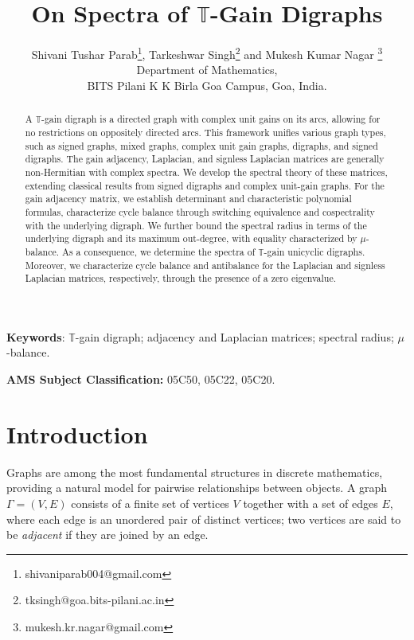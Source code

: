 \documentclass[12pt]{article}
\title{On Spectra of $\mathbb{T}$-Gain Digraphs}
\theoremstyle{definition}
\begin{document}
\author{Shivani Tushar Parab\footnote{shivaniparab004@gmail.com}, Tarkeshwar Singh\footnote{tksingh@goa.bits-pilani.ac.in} and Mukesh Kumar Nagar \footnote{mukesh.kr.nagar@gmail.com}\\
Department of Mathematics,\\
BITS Pilani K K Birla Goa Campus,
Goa, India.}
\date{}
\maketitle

                   
\begin{abstract}
A \(\mathbb{T}\)-gain digraph is a directed graph with complex unit gains on its arcs, allowing for no restrictions on oppositely directed arcs. This framework unifies various graph types, such as signed graphs, mixed graphs, complex unit gain graphs, digraphs, and signed digraphs. The gain adjacency, Laplacian, and signless Laplacian matrices are generally non-Hermitian with complex spectra. We develop the spectral theory of these matrices, extending classical results from signed digraphs and complex unit-gain graphs. For the gain adjacency matrix, we establish determinant and characteristic polynomial formulas, characterize cycle balance through switching equivalence and cospectrality with the underlying digraph. We further bound the spectral radius in terms of the underlying digraph and its maximum out-degree, with equality characterized by $\mu$-balance. As a consequence, we determine the spectra of $\mathbb{T}$-gain unicyclic digraphs. 
Moreover, we 
characterize cycle balance and antibalance for the Laplacian and signless Laplacian matrices, respectively, through the presence of a zero eigenvalue.



\end{abstract}

\textbf{Keywords}: $\mathbb{T}$-gain digraph; adjacency and Laplacian matrices; spectral radius; $\mu$-balance. 

\textbf{AMS Subject Classification:} 05C50, 05C22, 05C20.

\section{Introduction}
Graphs are among the most fundamental structures in discrete mathematics, providing a natural model for pairwise relationships between objects. A graph $\Gamma = (V, E)$ consists of a finite set of vertices $V$ together with a set of edges $E$, where each edge is an unordered pair of distinct vertices; two vertices are said to be \emph{adjacent} if they are joined by an edge.
\end{document}
